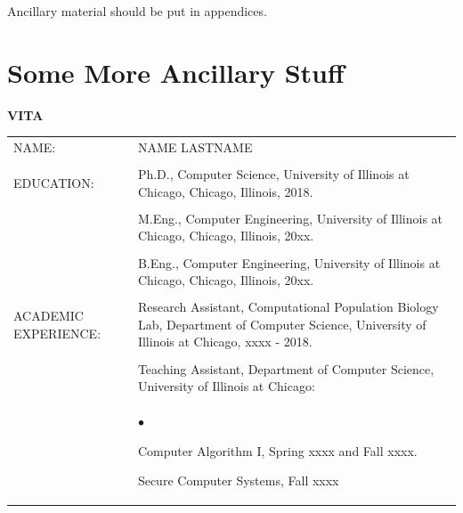 \documentclass{uicthesi}
\newcommand{\squishlist}{
   \begin{list}{$\bullet$}
    { \setlength{\itemsep}{-.1ex}      \setlength{\parsep}{0ex}
      \setlength{\topsep}{0ex}       \setlength{\partopsep}{0ex}
      \setlength{\leftmargin}{.8em} \setlength{\labelwidth}{1em}
      \setlength{\labelsep}{0.5em} } }
\newcommand{\squishend}{\end{list}}
\begin{document}
 Ancillary material should be put in appendices.

 \chapter{Some More Ancillary Stuff}


\bibformb

\newpage
\clearpage
    \pagestyle{pageontop}
   \thispagestyle{pageonbottom}
   \begin{large}
   \begin{center}
   {\bfseries VITA}
   \end{center}
   \end{large}
\begin{tabular}{p{2.8cm}p{10.5cm}}
NAME: & NAME LASTNAME  \\ 
    &\\
EDUCATION:  &Ph.D., Computer Science, University of Illinois at Chicago, Chicago, Illinois, 2018. \\  
            &\\
            &M.Eng., Computer Engineering, University of Illinois at Chicago, Chicago, Illinois, 20xx.\\
            &\\
            &B.Eng., Computer Engineering, University of Illinois at Chicago, Chicago, Illinois, 20xx.  \\
            &\\
ACADEMIC EXPERIENCE:  &Research Assistant, Computational Population Biology Lab, Department of Computer Science, University of Illinois at Chicago, xxxx - 2018. \\
            &\\
            &Teaching Assistant, Department of Computer Science, University of Illinois at Chicago: \\
            &\squishlist            
            \item Computer Algorithm I, Spring xxxx and  Fall xxxx.    
            \item Secure Computer Systems, Fall xxxx 
            \squishend \\
            

 \end{tabular}
\end{document}
